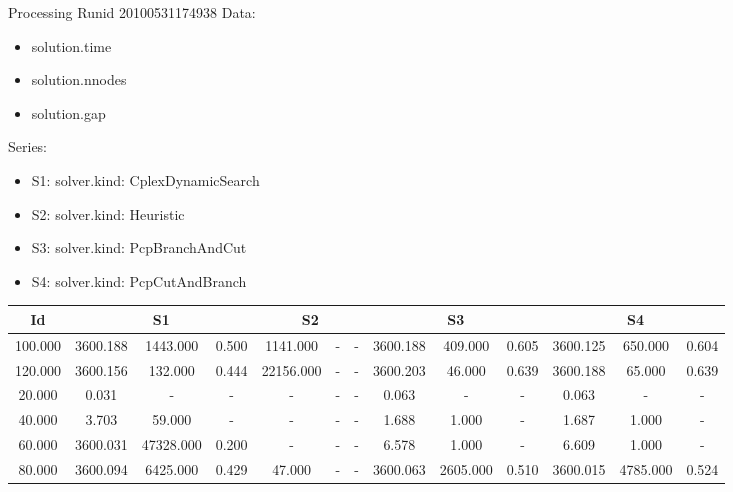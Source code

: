 \documentclass[landscape, 12pt]{report}
\begin{document}
\tiny


Processing Runid 20100531174938
Data:
\begin{itemize}
\item solution.time
\item solution.nnodes
\item solution.gap
\end{itemize}
Series:
\begin{itemize}
\item S1: solver.kind: CplexDynamicSearch
\item S2: solver.kind: Heuristic
\item S3: solver.kind: PcpBranchAndCut
\item S4: solver.kind: PcpCutAndBranch
\end{itemize}
\begin{tabular}{|c|ccc|ccc|ccc|ccc|}
\hline
\multicolumn{1}{|c|}{Id} & \multicolumn{3}{|c|}{S1} & \multicolumn{3}{|c|}{S2} & \multicolumn{3}{|c|}{S3} & \multicolumn{3}{|c|}{S4}
\\
\hline
100.000 & 3600.188 & 1443.000 & 0.500 & 1141.000 &    - &    - & 3600.188 & 409.000 & 0.605 & 3600.125 & 650.000 & 0.604
\\
120.000 & 3600.156 & 132.000 & 0.444 & 22156.000 &    - &    - & 3600.203 & 46.000 & 0.639 & 3600.188 & 65.000 & 0.639
\\
20.000 & 0.031 &    - &    - &    - &    - &    - & 0.063 &    - &    - & 0.063 &    - &    -
\\
40.000 & 3.703 & 59.000 &    - &    - &    - &    - & 1.688 & 1.000 &    - & 1.687 & 1.000 &    -
\\
60.000 & 3600.031 & 47328.000 & 0.200 &    - &    - &    - & 6.578 & 1.000 &    - & 6.609 & 1.000 &    -
\\
80.000 & 3600.094 & 6425.000 & 0.429 & 47.000 &    - &    - & 3600.063 & 2605.000 & 0.510 & 3600.015 & 4785.000 & 0.524
\\
\hline 

\end{tabular}
\end{document}
